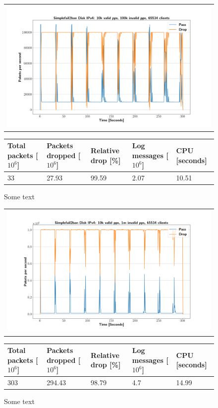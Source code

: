 \begin{figure}[p]
	\label{fig:simplefail2ban:disk:ip4:100k}
	\centering
	\scriptsize
	\begin{tabular}{c}
    	\centerline{\includegraphics[width=1.2\textwidth]{images/simplefail2ban_disk_ipv4_v10k_iv100k_c65534.png}}
	\end{tabular}
	\begin{tabular}{lllll}
		\toprule
		\textbf{Total packets [$10^6$]} & \textbf{Packets dropped [$10^6$]} & \textbf{Relative drop [\%]} & \textbf{Log messages [$10^6$]} & \textbf{CPU [seconds]} \\ \midrule 
		33 & 27.93 & 99.59 & 2.07 & 10.51 \\
		\bottomrule
	\end{tabular}
	\caption[Simplefail2ban Logfile IPv4 100k pps]{Some text}
\end{figure}

\begin{figure}[p]
	\label{fig:simplefail2ban:disk:ip4:1m}
	\centering
	\scriptsize
	\begin{tabular}{c}
    	\centerline{\includegraphics[width=1.2\textwidth]{images/simplefail2ban_disk_ipv4_v10k_iv1m_c65534.png}}
    \end{tabular}
	\begin{tabular}{lllll}
		\toprule
		\textbf{Total packets [$10^6$]} & \textbf{Packets dropped [$10^6$]} & \textbf{Relative drop [\%]} & \textbf{Log messages [$10^6$]} & \textbf{CPU [seconds]} \\ \midrule 
		303 & 294.43 & 98.79 & 4.7 & 14.99 \\
		\bottomrule
	\end{tabular}
	\caption[Simplefail2ban Logfile IPv4 1m PPS]{Some text}
\end{figure}

